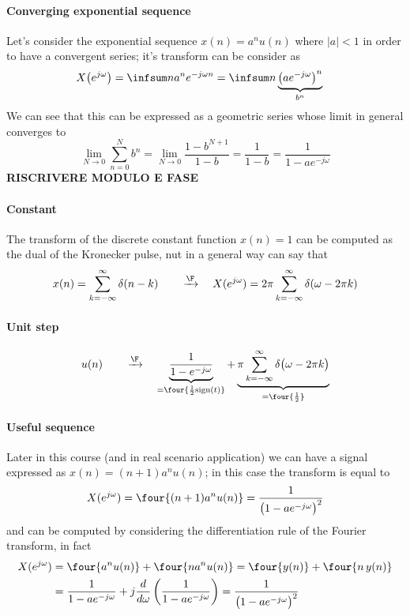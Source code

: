		\paragraph{Converging exponential sequence} Let's consider the exponential sequence $x(n) = a^n u(n)$ where $|a| < 1$ in order to have a convergent series; it's transform can be consider as
		\begin{align*}
			X\big(e^{j\omega}\big) & = \infsum n a^n e^{-j\omega n} = \infsum n  \underbrace{\left( a e^{-j\omega} \right)^n}_{b^n} 
		\end{align*}
		We can see that this can be expressed as a geometric series whose limit in general converges to
		\[ \lim_{N\rightarrow 0} \sum_{n=0}^N b^n = \lim_{N\rightarrow 0} \frac{1-b^{N+1}}{1-b} = \frac{1}{1-b} = \frac{1}{1-ae^{-j\omega}} \]
		\textbf{RISCRIVERE MODULO E FASE}
		
		\paragraph{Constant} The transform of the discrete constant function $x(n) = 1$ can be computed as the dual of the Kronecker pulse, nut in a general way can say that
		\[ x(n) = \sum_{k=-\infty}^\infty \delta(n-k) \qquad \xrightarrow{\F} \quad X(e^{j\omega}) = 2\pi \sum_{k=-\infty}^\infty \delta(\omega - 2\pi k) \]
		
		\paragraph{Unit step}
		\[ u(n) \qquad \xrightarrow{\F} \quad \underbrace{\frac{1 }{1-e^{-j\omega}}}_{=\four { \frac 1 2 \textrm{sign}(t)}} + \underbrace{\pi \sum_{k=-\infty}^\infty \delta \big(\omega - 2\pi k\big)}_{=\four{\frac 1 2}} \]
		
		\paragraph{Useful sequence} Later in this course (and in real scenario application) we can have a signal expressed as $x(n) = (n+1) a^n u(n)$; in this case the transform is equal to 
		\[ X(e^{j\omega}) = \four{(n+1)a^n u(n)} = \frac{1}{\big(1-ae^{-j\omega} \big)^2} \]
		and can be computed by considering the differentiation rule of the Fourier transform, in fact
		\begin{align*}
			X(e^{j\omega}) & = \four{a^n u(n)} + \four{n a^n u(n)} = \four{y(n)} + \four{n\, y(n)} \\
			& = \frac{1}{1-a e^{-j\omega}} + j \frac{d}{d\omega} \left(\frac{1}{1-a e^{-j\omega}}\right) = \frac{1}{\big(1-ae^{-j\omega} \big)^2}
		\end{align*}
	
